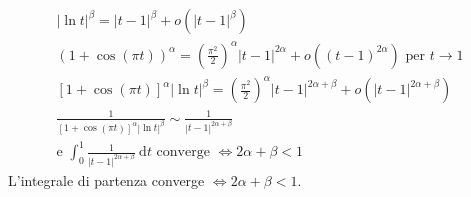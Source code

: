 \begin{exbar}
\begin{example}
\begin{gather*}
		\\
		|\ln t|^\beta = |t - 1|^\beta + o(|t - 1|^\beta)
		\\
		(1 + \cos(\pi t))^\alpha = \left( \frac{\pi^2}{2} \right) ^\alpha |t-1|^{2\alpha} + o((t-1)^{2\alpha}) \text{ per } t \rightarrow 1
		\\
		[1 + \cos(\pi t)]^\alpha |\ln t|^\beta = \left(\frac{\pi^2}{2}\right)^\alpha |t-1|^{2\alpha+\beta} +o(|t-1|^{2\alpha+\beta})
		\\
		\frac{1}{[1 + \cos(\pi t)]^\alpha |\ln t|^\beta} \sim \frac{1}{|t-1|^{2\alpha+\beta}}
		\\ 
		\text{e } \int_{0}^{1} \frac{1}{|t-1|^{2\alpha+\beta}} \ \mathrm{d}t  \text{ converge }  \iff 2 \alpha + \beta < 1
	\end{gather*}
	L'integrale di partenza converge $\iff 2 \alpha +\beta < 1$.
\end{example}
\end{exbar}


